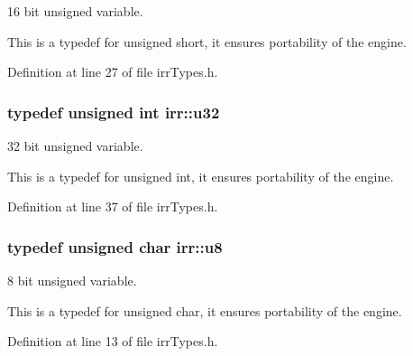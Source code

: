 16 bit unsigned variable. 

This is a typedef for unsigned short, it ensures portability of the engine. 

Definition at line 27 of file irrTypes.h.\hypertarget{namespaceirr_0416a53257075833e7002efd0a18e804}{
\subsubsection[{u32}]{\setlength{\rightskip}{0pt plus 5cm}typedef unsigned int {\bf irr::u32}}}
\label{namespaceirr_0416a53257075833e7002efd0a18e804}


32 bit unsigned variable. 

This is a typedef for unsigned int, it ensures portability of the engine. 

Definition at line 37 of file irrTypes.h.\hypertarget{namespaceirr_646874f69af8ff87fc10201b0254a761}{
\subsubsection[{u8}]{\setlength{\rightskip}{0pt plus 5cm}typedef unsigned char {\bf irr::u8}}}
\label{namespaceirr_646874f69af8ff87fc10201b0254a761}


8 bit unsigned variable. 

This is a typedef for unsigned char, it ensures portability of the engine. 

Definition at line 13 of file irrTypes.h.